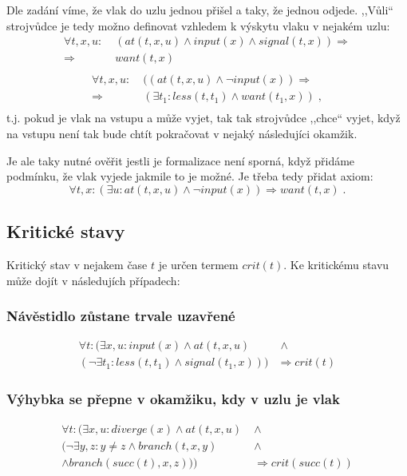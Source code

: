 \documentclass[a4paper,journal]{IEEEtran}
\begin{document}
Dle zadání víme, že vlak do uzlu jednou přišel a taky, že jednou odjede. ,,Vůli`` strojvůdce je tedy možno definovat
vzhledem k výskytu vlaku v nejakém uzlu:
\begin{equation}
\begin{split}
	\forall t,x,u: &\;(at(t,x,u) \wedge input(x) \wedge signal(t,x)) \Rightarrow \\
	\Rightarrow &\; want(t,x)\\
\end{split}
\end{equation}
\begin{equation}
\begin{split}
\forall t,x,u: &\;((at(t,x,u) \wedge \neg input(x)) \Rightarrow \\
\Rightarrow&\;(\exists t_1: less(t,t_1) \wedge want(t_1,x) ) \;,\\
\end{split}
\end{equation}
t.j. pokud je vlak na vstupu a může vyjet, tak tak strojvůdce ,,chce`` vyjet, když na vstupu není 
tak bude chtít pokračovat v nejaký následujíci okamžik.

Je ale taky nutné ověřit jestli je formalizace není sporná, 
když přidáme podmínku, že vlak vyjede jakmile to je možné. 
Je třeba tedy přidat axiom:
\begin{equation}
\forall t,x: (\exists u: at(t,x,u) \wedge \neg input(x)) \Rightarrow want(t,x)\;.
\end{equation}


\subsection{Kritické stavy}
Kritický stav v nejakem čase $t$ je určen termem $crit(t)$. Ke kritickému stavu může dojít v 
následujích případech:
\subsubsection{Návěstidlo zůstane trvale uzavřené}
\begin{equation}
\begin{split}
\forall t: (\exists x,u: input(x) \wedge at(t,x,u)& \;\wedge\\
 (\neg \exists t_1: less(t,t_1) \wedge signal(t_1,x))) &\Rightarrow crit(t)
\end{split}
\end{equation}
\subsubsection{Výhybka se přepne v okamžiku, kdy v uzlu je vlak}
\begin{equation}
\begin{split}
\forall t: (\exists x,u: diverge(x) \wedge at(t,x,u)& \;\wedge\\
 (\neg \exists y,z: y\not=z \wedge branch(t,x,y) & \;\wedge  \\
 \wedge branch(succ(t),x,z) )) &\;\Rightarrow crit(succ(t))
\end{split}
\end{equation}
\end{document}
